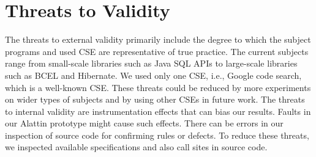 \section{Threats to Validity}
\label{sec:threats}
The threats to external validity primarily include the degree to which the subject programs and used CSE are representative of true practice. The current subjects range from small-scale libraries such as Java SQL APIs to large-scale libraries such as BCEL and Hibernate. We used only one CSE, i.e., Google code search, which is a well-known CSE. These threats could be reduced by more experiments on wider types of subjects and by using other CSEs in future work. The threats to internal validity are instrumentation effects that can bias our results. Faults in our Alattin prototype might cause such effects. There can be errors in our inspection of source code for confirming rules or defects. To reduce these threats, we inspected available specifications and also call sites in source code.